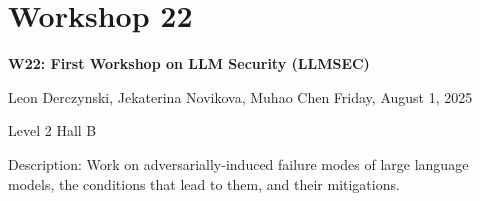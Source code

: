 \clearpage


\section[W22: First Workshop on LLM Security (LLMSEC)]{Workshop 22}

\begin{center}
    {\Large \textbf{W22: First Workshop on LLM Security (LLMSEC)}}

Leon Derczynski, Jekaterina Novikova, Muhao Chen
    Friday, August 1, 2025

   Level 2 Hall B
    
\end{center}

Description: Work on adversarially-induced failure modes of large language models, the conditions that lead to them, and their mitigations.

